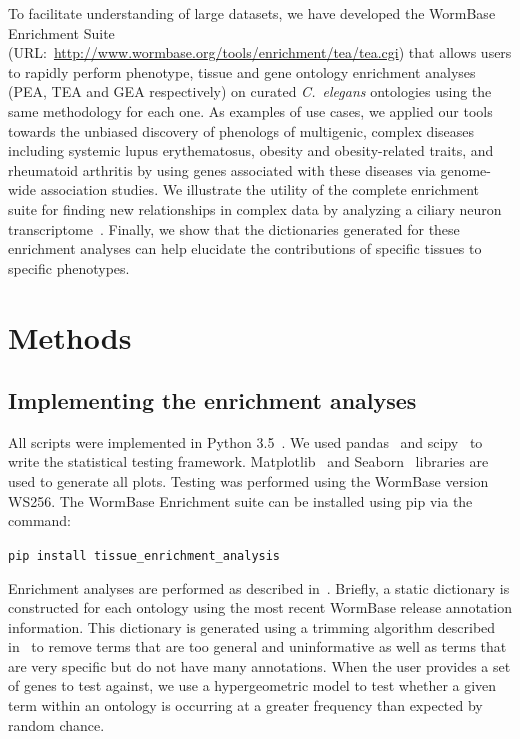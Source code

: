 \documentclass[10pt, onecolumn]{article}
\newcommand{\cel}{\emph{C.~elegans}}
\begin{document}
To facilitate understanding of large datasets, we have developed the WormBase
Enrichment Suite (URL:\
\url{http://www.wormbase.org/tools/enrichment/tea/tea.cgi}) that allows users to
rapidly perform phenotype, tissue and gene ontology enrichment analyses (PEA,
TEA and GEA respectively) on curated \cel{} ontologies using the same
methodology for each one. As examples of use cases, we applied our tools towards
the unbiased discovery of phenologs of multigenic, complex diseases including
systemic lupus erythematosus, obesity and obesity-related traits, and rheumatoid
arthritis by using genes associated with these diseases via genome-wide
association studies. We illustrate the utility of the complete enrichment suite
for finding new relationships in complex data by analyzing a ciliary neuron
transcriptome~\cite{Wang2015}. Finally, we show that the dictionaries generated
for these enrichment analyses can help elucidate the contributions of specific
tissues to specific phenotypes.

\section*{Methods}
\subsection*{Implementing the enrichment analyses}
All scripts were implemented in Python 3.5~\cite{Rossum2011}. We used
pandas~\cite{McKinney2011} and scipy~\cite{Oliphant2007} to write the
statistical testing framework. Matplotlib~\cite{Hunter2007} and
Seaborn~\cite{Waskom} libraries are used to generate all plots. Testing was
performed using the WormBase version WS256. The WormBase Enrichment suite can be
installed using pip via the command:

\texttt{pip install tissue\_enrichment\_analysis}

Enrichment analyses are performed as described in~\cite{Angeles-Albores2016}.
Briefly, a static dictionary is constructed for each ontology using the most
recent WormBase release annotation information. This dictionary is generated
using a trimming algorithm described in~\cite{Angeles-Albores2016} to remove
terms that are too general and uninformative as well as terms that are very
specific but do not have many annotations. When the user provides a set of genes
to test against, we use a hypergeometric model to test whether a given term
within an ontology is occurring at a greater frequency than expected by random
chance.
\end{document}

